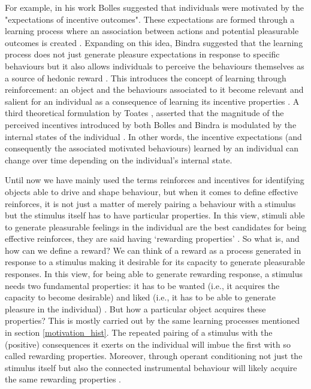 For example, in his work Bolles \cite{bolles1972reinforcement} suggested that individuals were motivated by the "expectations of incentive outcomes". These expectations are formed through a learning process where an association between actions and potential pleasurable outcomes is created \cite{bolles1972reinforcement,berridge2004motivation}. Expanding on this idea, Bindra \cite{bindra1978adaptive} suggested that the learning process does not just generate pleasure expectations in response to specific behaviours but it also allows individuals to perceive the behaviours themselves as a source of hedonic reward \cite{bindra1978adaptive,berridge2004motivation}.
This introduces the concept of learning through reinforcement: an object and the behaviours associated to it become relevant and salient for an individual as a consequence of learning its incentive properties \cite{berridge2004motivation}. A third theoretical formulation by Toates \cite{toates1994comparing}, asserted that the magnitude of the perceived incentives introduced by both Bolles and Bindra is modulated by the internal states of the individual \cite{toates1994comparing,berridge2004motivation}. In other words, the incentive expectations (and consequently the associated motivated behaviours) learned by an individual can change over time depending on the individual's internal state. 

Until now we have mainly used the terms reinforces and incentives for identifying objects able to drive and shape behaviour, but when it comes to define effective reinforces, it is not just a matter of merely pairing a behaviour with a stimulus but the stimulus itself has to have particular properties. In this view, stimuli able to generate pleasurable feelings in the individual are the best candidates for being effective reinforces, they are said having ‘rewarding properties’ \cite{berridge2004motivation}. So what is, and how can we define a reward? We can think of a reward as a process generated in response to a stimulus making it desirable for its capacity to generate pleasurable responses. In this view, for being able to generate rewarding response, a stimulus needs two fundamental properties: it has to be wanted (i.e., it acquires the capacity to become desirable) and liked (i.e., it has to be able to generate pleasure in the individual) \cite{berridge2009dissecting}. But how a particular object acquires these properties? This is mostly carried out by the same learning processes mentioned in section \ref{motivation_hist}. The repeated pairing of a stimulus with the (positive) consequences it exerts on the individual will imbue the first with so called rewarding properties. Moreover, through operant conditioning not just the stimulus itself but also the connected instrumental behaviour will likely acquire the same rewarding properties \cite{berridge2009dissecting}. 

